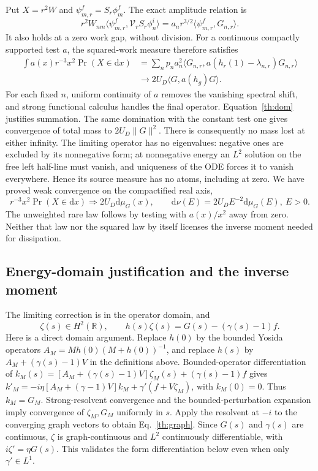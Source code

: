 \documentclass[aps,prl,reprint,superscriptaddress,longbibliography]{revtex4-2}
\newcommand{\dd}{\mathrm{d}}
\begin{document}
Put $X=r^2W$ and $\psi_{m,r}^f=S_r\phi_m^f$. The exact amplitude relation is
\begin{equation}
 r^2W_{nm}\langle\psi_{m,r}^f,\mathcal V_rS_r\phi_n^i\rangle
 =a_nr^{3/2}\langle\psi_{m,r}^f,G_{n,r}\rangle.\label{th:amp}
\end{equation}
It also holds at a zero work gap, without division. For a continuous compactly supported test $a$, the squared-work measure therefore satisfies
\begin{align}
 \int a(x)r^{-3}x^2\Pr(X\in\dd x)
 &=\sum_np_n a_n^2\langle G_{n,r},
 a(h_r(1)-\lambda_{n,r})G_{n,r}\rangle\nonumber\\
 &\longrightarrow2U_D\langle G,a(h_g)G\rangle.
 \label{th:squarelaw}
\end{align}
For each fixed $n$, uniform continuity of $a$ removes the vanishing spectral shift, and strong functional calculus handles the final operator. Equation~\eqref{th:dom} justifies summation. The same domination with the constant test one gives convergence of total mass to $2U_D\|G\|^2$. There is consequently no mass lost at either infinity. The limiting operator has no eigenvalues: negative ones are excluded by its nonnegative form; at nonnegative energy an $L^2$ solution on the free left half-line must vanish, and uniqueness of the ODE forces it to vanish everywhere. Hence its source measure has no atoms, including at zero. We have proved weak convergence on the compactified real axis,
\begin{equation}
 r^{-3}x^2\Pr(X\in\dd x)\Rightarrow2U_D\dd\mu_G(x),
 \qquad \dd\nu(E)=2U_DE^{-2}\dd\mu_G(E),\ E>0.
 \label{th:rare}
\end{equation}
The unweighted rare law follows by testing with $a(x)/x^2$ away from zero. Neither that law nor the squared law by itself licenses the inverse moment needed for dissipation.

\subsection{Energy-domain justification and the inverse moment}

The limiting correction is in the operator domain, and
\begin{equation}
 \zeta(s)\in H^2(\mathbb R),\qquad
 h(s)\zeta(s)=G(s)-(\gamma(s)-1)f.\label{th:graph}
\end{equation}
Here is a direct domain argument. Replace $h(0)$ by the bounded Yosida operators $A_M=Mh(0)(M+h(0))^{-1}$, and replace $h(s)$ by $A_M+(\gamma(s)-1)V$ in the definitions above. Bounded-operator differentiation of
\(k_M(s)=[A_M+(\gamma(s)-1)V]\zeta_M(s)+(\gamma(s)-1)f\)
gives $k'_M=-i\eta[A_M+(\gamma-1)V]k_M+\gamma'(f+V\zeta_M)$, with $k_M(0)=0$. Thus $k_M=G_M$. Strong-resolvent convergence and the bounded-perturbation expansion imply convergence of $\zeta_M,G_M$ uniformly in $s$. Apply the resolvent at $-i$ to the converging graph vectors to obtain Eq.~\eqref{th:graph}. Since $G(s)$ and $\gamma(s)$ are continuous, $\zeta$ is graph-continuous and $L^2$ continuously differentiable, with $i\zeta'=\eta G(s)$. This validates the form differentiation below even when only $\gamma'\in L^1$.
\end{document}
